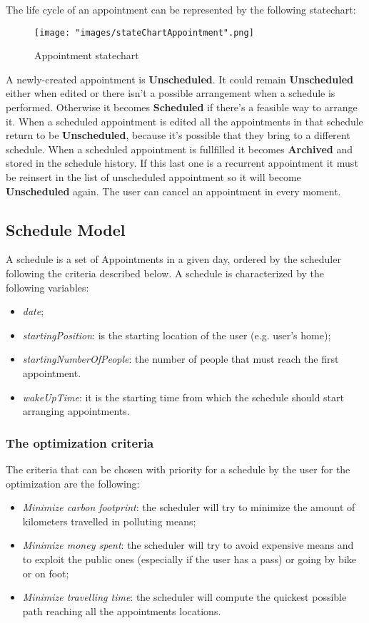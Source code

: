 The life cycle of an appointment can be represented by the following statechart:
\begin{figure}[H]
\begin{center}
\texttt{[image: "images/stateChartAppointment".png]}
\caption{Appointment statechart}
\end{center}
\end{figure}

A newly-created appointment is \textbf{Unscheduled}. It could remain \textbf{Unscheduled} either when edited or there isn't a possible arrangement when a schedule is performed. Otherwise it becomes \textbf{Scheduled} if there's a feasible way to arrange it. When a scheduled appointment is edited all the appointments in that schedule return to be \textbf{Unscheduled}, because it's possible that they bring to a different schedule. When a scheduled appointment is fullfilled it becomes \textbf{Archived} and stored in the schedule history. If this last one is a recurrent appointment it must be reinsert in the list of unscheduled appointment so it will become \textbf{Unscheduled} again. The user can cancel an appointment in every moment. 

\subsection{Schedule Model} \label{subsect:schmodel}
A schedule is a set of Appointments in a given day, ordered by the scheduler following the criteria described below.
A schedule is characterized by the following variables:
\begin{itemize}
\item \textit{date};
\item \textit{startingPosition}: is the starting location of the user (e.g. user's home);
\item \textit{startingNumberOfPeople}: the number of people that must reach the first appointment.
\item \textit{wakeUpTime}: it is the starting time from which the schedule should start arranging appointments.
\end{itemize}

\subsubsection{The optimization criteria} \label{subsubsect:optcriteria} 
The criteria that can be chosen with priority for a schedule by the user  for the optimization are the following:
\begin{itemize}
\item \textit{Minimize carbon footprint}: the scheduler will try to minimize the amount of kilometers travelled in polluting means;
\item \textit{Minimize money spent}: the scheduler will try to avoid expensive means and to exploit the public ones (especially if the user has a pass) or going by bike or on foot;
\item \textit{Minimize travelling time}: the scheduler will compute the quickest possible path reaching all the appointments locations.
\end{itemize}

